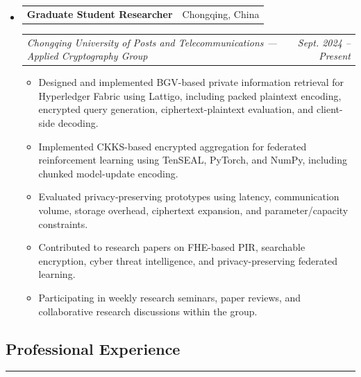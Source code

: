 \documentclass[11pt,letterpaper]{article}
\makeatletter
\newcommand{\headerrow}[2]
{\begin{tabular*}{\linewidth}{l@{\extracolsep{\fill}}r}
#1 & #2 \\
\end{tabular*}}
\makeatother
\begin{document}
\renewcommand\labelitemi{}
\renewcommand\labelitemii{$\bullet$}
\begin{itemize}[leftmargin=0em, itemsep=0.6em]
    \parskip=0.1em

    \item
    \headerrow
        {\textbf{Graduate Student Researcher}}
        {Chongqing, China}
    \headerrow
        {\emph{Chongqing University of Posts and Telecommunications --- Applied Cryptography Group}}
        {\emph{Sept. 2024 -- Present}}
    \begin{itemize}[leftmargin=1.2em, itemsep=0.1em]
        \renewcommand\labelitemi{$\bullet$}
        \item Designed and implemented BGV-based private information retrieval for Hyperledger Fabric using Lattigo, including packed plaintext encoding, encrypted query generation, ciphertext-plaintext evaluation, and client-side decoding.
        \item Implemented CKKS-based encrypted aggregation for federated reinforcement learning using TenSEAL, PyTorch, and NumPy, including chunked model-update encoding.
        \item Evaluated privacy-preserving prototypes using latency, communication volume, storage overhead, ciphertext expansion, and parameter/capacity constraints.
        \item Contributed to research papers on FHE-based PIR, searchable encryption, cyber threat intelligence, and privacy-preserving federated learning.
        \item Participating in weekly research seminars, paper reviews, and collaborative research discussions within the group.
    \end{itemize}

\end{itemize}

\vspace{0.2cm}

\subsection*{\Large Professional Experience}
\vspace{-0.5em}
\hrule
\vspace{0.3em}
\end{document}
